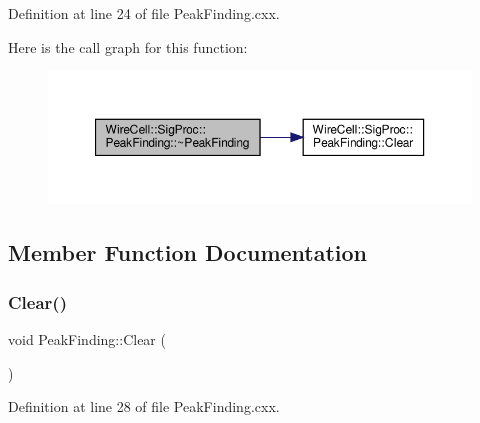 Definition at line 24 of file Peak\+Finding.\+cxx.

Here is the call graph for this function\+:
\nopagebreak
\begin{figure}[H]
\begin{center}
\leavevmode
\includegraphics[width=350pt]{class_wire_cell_1_1_sig_proc_1_1_peak_finding_abc705320887d205ed48a5aa3d3022245_cgraph}
\end{center}
\end{figure}


\subsection{Member Function Documentation}
\mbox{\label{class_wire_cell_1_1_sig_proc_1_1_peak_finding_ab4d567863883d75efc434f8193cd4b6a}} 
\subsubsection{\texorpdfstring{Clear()}{Clear()}}
{\footnotesize\ttfamily void Peak\+Finding\+::\+Clear (\begin{DoxyParamCaption}{ }\end{DoxyParamCaption})}



Definition at line 28 of file Peak\+Finding.\+cxx.

